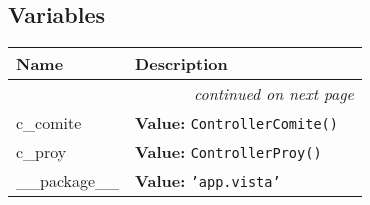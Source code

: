   \subsection{Variables}

    \vspace{-1cm}
\hspace{\varindent}\begin{longtable}{|p{\varnamewidth}|p{\vardescrwidth}|l}
\cline{1-2}
\cline{1-2} \centering \textbf{Name} & \centering \textbf{Description}& \\
\cline{1-2}
\endhead\cline{1-2}\multicolumn{3}{r}{\small\textit{continued on next page}}\\\endfoot\cline{1-2}
\endlastfoot\raggedright c\-\_\-c\-o\-m\-i\-t\-e\- & \raggedright \textbf{Value:} 
{\tt ControllerComite()}&\\
\cline{1-2}
\raggedright c\-\_\-p\-r\-o\-y\- & \raggedright \textbf{Value:} 
{\tt ControllerProy()}&\\
\cline{1-2}
\raggedright \_\-\_\-p\-a\-c\-k\-a\-g\-e\-\_\-\_\- & \raggedright \textbf{Value:} 
{\tt \texttt{'}\texttt{app.vista}\texttt{'}}&\\
\cline{1-2}
\end{longtable}

